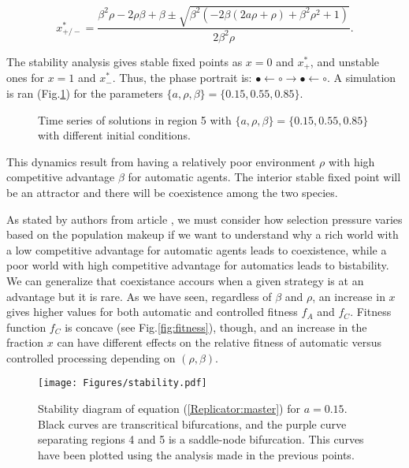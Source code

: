 \documentclass[10pt,a4paper]{article}
\begin{document}
\begin{itemize}
{ $$x^*_{+/-} = \frac{\beta^2\rho - 2\rho\beta + \beta \pm \sqrt{\beta^2 (-2\beta(2a\rho+\rho)+\beta^2\rho^2+1)}}{2\beta^2\rho}.$$
 
 The stability analysis gives stable fixed points as $x=0$ and $x^*_+$, and unstable ones for $x=1$ and $x^*_-$. Thus, the phase portrait is: 
 $\bullet\leftarrow\circ\rightarrow\bullet\leftarrow\circ$. A simulation is ran (Fig.\ref{fig:region5}) for the parameters $\{a,\rho,\beta\}=\{0.15,0.55,0.85\}$.
 
\begin{figure}[h!]
\centering
\vspace{-1.5cm}
\vspace{-2.2cm}
\newline
{}
\vspace{-0.4cm}
\caption{Time series of solutions in region 5 with  $\{a,\rho,\beta\}=\{0.15,0.55,0.85\}$ with different initial conditions.}
\label{fig:region5}
\end{figure}
 
 This dynamics result from having a relatively poor environment $\rho$ with high competitive advantage $\beta$ for automatic agents. The interior stable 
 fixed point will be an attractor and there will be coexistence among the two species. 
 }
\end{itemize}

As stated by authors from article \cite{Strogatz:evolutionary}, we must consider how selection pressure varies based on the population makeup if we want to
understand why a rich world with a low competitive advantage for automatic agents leads to coexistence, while a poor world with high competitive advantage for 
automatics leads to bistability. We can generalize that coexistance accours when a given strategy is at an advantage but it is rare. As we have seen, regardless 
of $\beta$ and $\rho$, an increase in $x$ gives higher values for both automatic and controlled fitness $f_A$ and $f_C$. Fitness function $f_C$ is concave 
(see Fig.\ref{fig:fitness}),
though, and an increase in the fraction $x$ can have different effects on the relative fitness of automatic versus controlled processing depending on $(\rho,\beta)$. 

\begin{figure}[h!]
\centering
\vspace{-1.5cm}
\texttt{[image: Figures/stability.pdf]}
\vspace{-0.4cm}
\caption{Stability diagram of equation (\ref{Replicator:master}) for $a=0.15$. Black curves are transcritical bifurcations, and the purple curve separating regions 4 and 5
is a saddle-node bifurcation. This curves have been plotted using the analysis made in the previous points.}
\label{fig:stability}
\end{figure}
 
\end{document}
